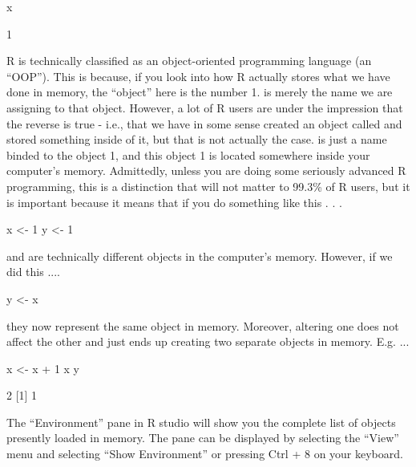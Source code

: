 \begin{inR}
x
\end{inR}

\begin{outR}
[1] 1
\end{outR}

R is technically classified as an object-oriented programming language (an ``OOP''). This is because, if you look into how R actually stores what we have done in memory, the ``object'' here is the number 1.   is merely the name we are assigning to that object. However, a lot of R users are under the impression that the reverse is true - i.e., that we have in some sense created an object called  and stored something inside of it, but that is not actually the case.  is just a name binded to the object 1, and this object 1 is located somewhere inside your computer's memory. Admittedly, unless you are doing some seriously advanced R programming, this is a distinction that will not matter to 99.3\% of R users, but it is important because it means that if you do something like this . . . 

\begin{inR}
x <- 1
y <- 1
\end{inR}

\vspace{1em}

\noindent {} and  are technically different objects in the computer's memory.  However, if we did this ....

\begin{inR}
y <- x
\end{inR}

\vspace{1em}

\noindent they now represent the same object in memory. Moreover, altering one does not affect the other and just ends up creating two separate objects in memory. E.g. ...

\begin{inR}
x <- x + 1
x
y
\end{inR}

\begin{outR}
[1] 2
[1] 1
\end{outR}

The ``Environment'' pane in R studio will show you the complete list of objects presently loaded in memory. The pane can be displayed by selecting the ``View'' menu and selecting ``Show Environment'' or pressing Ctrl + 8 on your keyboard.

